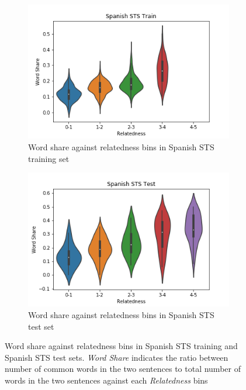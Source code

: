 \begin{enumerate}
\begin{figure}
	\captionsetup[subfigure]{justification=centering}
	\centering
	\begin{subfigure}[b]{.5\textwidth}
		\centering
		\includegraphics[width=\textwidth]{figures/semantic_textual_similarity/introduction/spanish_sts_train_word_share.png}
		\caption{Word share against relatedness bins in Spanish STS training set}
		\label{fig:spanish_sts_train_word_share}
	\end{subfigure}%
	\begin{subfigure}[b]{.5\textwidth}
		\centering
		\includegraphics[width=\textwidth]{figures/semantic_textual_similarity/introduction/spanish_sts_test_word_share.png}
		\caption{Word share against relatedness bins in Spanish STS test set}
		\label{fig:spanish_sts_test_word_share}
	\end{subfigure}
	\caption[Word share against relatedness bins in Spanish STS training and STS 2017 test sets.]{Word share against relatedness bins in Spanish STS training and Spanish STS test sets. \textit{Word Share} indicates the ratio between number of common words in the two sentences to total number of words in the two sentences against each \textit{Relatedness} bins}
	\label{fig:spanish_sts_word_share}
\end{figure}


\end{enumerate}

